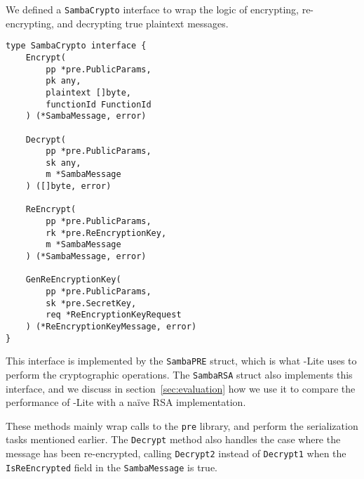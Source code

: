 We defined a \texttt{Samba\-Crypto} interface to wrap the logic of encrypting, re-encrypting, and decrypting true plaintext messages. 
\begin{lstlisting}
type SambaCrypto interface {
	Encrypt(
		pp *pre.PublicParams,
		pk any,
		plaintext []byte,
		functionId FunctionId
	) (*SambaMessage, error)

	Decrypt(
		pp *pre.PublicParams,
		sk any,
		m *SambaMessage
	) ([]byte, error)

	ReEncrypt(
		pp *pre.PublicParams,
		rk *pre.ReEncryptionKey,
		m *SambaMessage
	) (*SambaMessage, error)

	GenReEncryptionKey(
		pp *pre.PublicParams,
		sk *pre.SecretKey,
		req *ReEncryptionKeyRequest
	) (*ReEncryptionKeyMessage, error)
}
\end{lstlisting}
This interface is implemented by the \texttt{SambaPRE} struct, which is what \SystemName-Lite uses to perform the cryptographic operations.
The \texttt{SambaRSA} struct also implements this interface, and we discuss in section~\ref{sec:evaluation} how we use it to compare the performance of \SystemName-Lite with a na\"{i}ve RSA implementation.

These methods mainly wrap calls to the \texttt{pre} library, and perform the serialization tasks mentioned earlier. The \texttt{Decrypt} method also handles the case where the message has been re-encrypted, calling \texttt{Decrypt2} instead of \texttt{Decrypt1} when the \texttt{IsReEncrypted} field in the \texttt{SambaMessage} is true.




